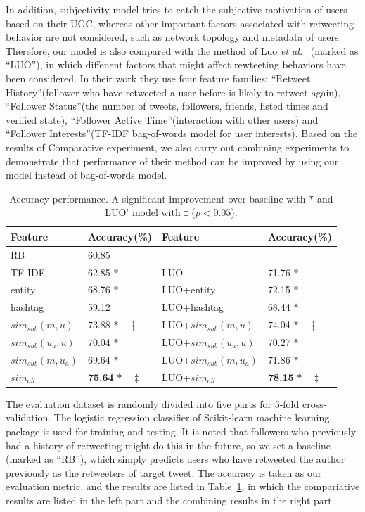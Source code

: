 \documentclass{acm_proc_article-sp}
\begin{document}
In addition, subjectivity model tries to catch the subjective motivation of users based on their UGC, whereas other important factors associated with retweeting behavior are not considered, such as network topology and metadata of users. 
Therefore, our model is also compared with the method of Luo \emph{et al.}~ (marked as ``LUO''), in which diffenent factors that might affect rewteeting behaviors have been considered.
In their work they use four feature families: ``Retweet History''(follower who have retweeted a user before is likely to retweet again), ``Follower Status''(the number of tweets, followers, friends, listed times and verified state), ``Follower Active Time''(interaction with other users) and ``Follower Interests''(TF-IDF bag-of-words model for user interests). 
Based on the results of Comparative experiment, we also carry out combining experiments to demonstrate that performance of their method can be improved by using our model instead of bag-of-words model. 
\begin{table}[h]
\scriptsize
\centering
\caption{Accuracy performance. A significant improvement over baseline with $ \ast $ and LUO' model with $ \ddagger $ ($p < 0.05$).}
\label{tab3}
\begin{tabular}{|l|l|l|l|}
\hline
Feature & Accuracy(\%) & Feature & Accuracy(\%)\\
\hline
RB & 60.85 & & \\
TF-IDF & 62.85   $\ast$ & LUO & 71.76 $ \ast  $\\
entity & 68.76  $\ast$ & LUO+entity & 72.15 $\ast$\\
hashtag & 59.12  & LUO+hashtag & 68.44 $\ast$\\
$ sim_{sub} \left( m,u \right) $ & 73.88   $\ast  \quad \ddagger $ &LUO+$ sim_{sub} \left( m,u \right)$ & 74.04  $ \ast \quad \ddagger $\\
$ sim_{sub}\left( u_{a},u \right)  $ & 70.04   $\ast  $ & LUO+$ sim_{sub}\left( u_{a},u \right)$ & 70.27  $ \ast $\\
$ sim_{sub}\left( m,u_{a} \right)  $ & 69.64   $\ast  $ & LUO+$ sim_{sub}\left( m,u_{a} \right)$ & 71.86  $ \ast $\\
$ sim_{all}  $ & \textbf{75.64}   $\ast \quad \ddagger $ & LUO+$ sim_{all}  $ & \textbf{78.15}  $ \ast \quad \ddagger $\\
\hline
\end{tabular}
\end{table}

The evaluation dataset is randomly divided into five parts for 5-fold cross-validation. 
The logistic regression classifier of Scikit-learn machine learning package \cite{scikit-learn} is used for training and testing.
It is noted that followers who previously had a history of retweeting might do this in the future, so we set a baseline (marked as ``RB''), which simply predicts users who have retweeted the author previously as the retweeters of target tweet. 
The accuracy is taken as our evaluation metric, and the results are listed in Table~\ref{tab3}, in which the compariative results are listed in the left part and the combining results in the right part.
\end{document}
